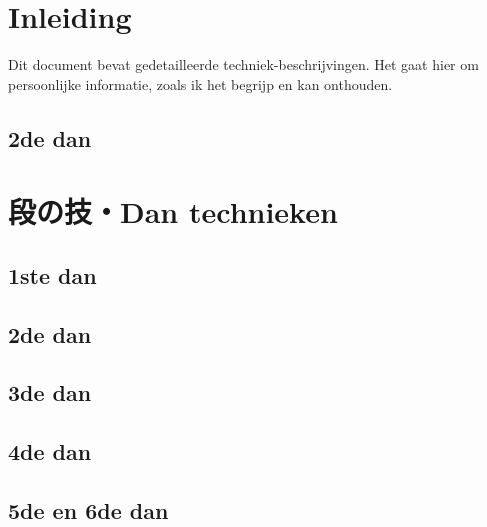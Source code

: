 \documentclass[a4paper, 12pt]{article}
\begin{document}

\begin{CJK*}{UTF8}{min}
\CJKtilde



\newpage
\setcounter{page}{1}
\tableofcontents

\newpage
\setcounter{page}{1}

\section{Inleiding}
\noindent Dit document bevat gedetailleerde techniek-beschrijvingen. Het gaat hier om persoonlijke informatie, zoals ik het begrijp en kan onthouden.

\subsection{2de dan}
\newpage
\section{段の技・Dan technieken}
\subsection{1ste dan}


\newpage
\subsection{2de dan}


\newpage
\subsection{3de dan}


\newpage
\subsection{4de dan}


\newpage
\subsection{5de en 6de dan}


\end{CJK*}
\end{document}
